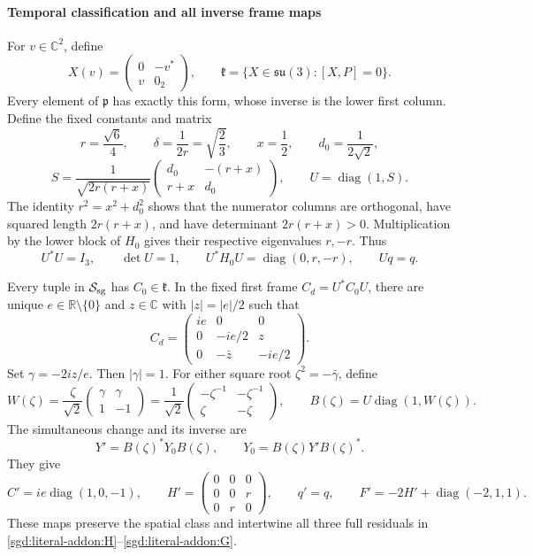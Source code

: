 \paragraph{Temporal classification and all inverse frame maps}

For $v\in\mathbb C^2$, define
\[
 X(v)=\begin{pmatrix}0&-v^*\\v&0_2\end{pmatrix},\qquad
 \mathfrak k=\{X\in\mathfrak{su}(3):[X,P]=0\}.
\]
Every element of $\mathfrak p$ has exactly this form, whose inverse
is the lower first column. Define the fixed constants and matrix
\[
 r=\frac{\sqrt6}{4},\qquad \delta=\frac1{2r}=\sqrt{\frac23},
 \qquad x=\frac12,\qquad d_0=\frac1{2\sqrt2},
\]
\[
 S=\frac1{\sqrt{2r(r+x)}}
 \begin{pmatrix}d_0&-(r+x)\\r+x&d_0\end{pmatrix},
 \qquad U=\operatorname{diag}(1,S).
\]
The identity $r^2=x^2+d_0^2$ shows that the numerator columns
are orthogonal, have squared length $2r(r+x)$, and have determinant
$2r(r+x)>0$. Multiplication by the lower block of $H_0$ gives
their respective eigenvalues $r,-r$. Thus
\[
 U^*U=I_3,\qquad \det U=1,\qquad
 U^*H_0U=\operatorname{diag}(0,r,-r),\qquad Uq=q.
\]

\begin{lemma}
\label{sgd:literal-addon:temporal}
Every tuple in $\mathcal S_{\rm sg}$ has $C_0\in\mathfrak k$.
In the fixed first frame $C_d=U^*C_0U$, there are unique
$e\in\mathbb R\setminus\{0\}$ and $z\in\mathbb C$ with
$|z|=|e|/2$ such that
\[
 C_d=\begin{pmatrix}
 ie&0&0\\0&-ie/2&z\\0&-\bar z&-ie/2
 \end{pmatrix}.
\]
Set $\gamma=-2iz/e$. Then $|\gamma|=1$. For either square root
$\zeta^2=-\bar\gamma$, define
\[
 W(\zeta)=\frac{\zeta}{\sqrt2}
 \begin{pmatrix}\gamma&\gamma\\1&-1\end{pmatrix}
 =\frac1{\sqrt2}
 \begin{pmatrix}-\zeta^{-1}&-\zeta^{-1}\\\zeta&-\zeta\end{pmatrix},
 \qquad B(\zeta)=U\operatorname{diag}(1,W(\zeta)).
\]
The simultaneous change and its inverse are
\begin{equation}
 Y'=B(\zeta)^*Y_0B(\zeta),\qquad
 Y_0=B(\zeta)Y'B(\zeta)^*.
 \label{sgd:literal-addon:frame}
\end{equation}
They give
\[
 C'=ie\operatorname{diag}(1,0,-1),\qquad
 H'=\begin{pmatrix}0&0&0\\0&0&r\\0&r&0\end{pmatrix},\qquad
 q'=q,\qquad F'=-2H'+\operatorname{diag}(-2,1,1).
\]
These maps preserve the spatial class and intertwine all three full
residuals in \eqref{sgd:literal-addon:H}--\eqref{sgd:literal-addon:G}.
\end{lemma}

